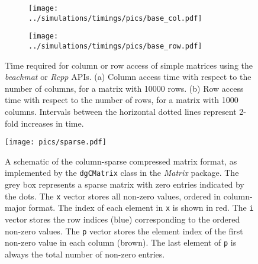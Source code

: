 \documentclass{article}
\newcommand{\beachmat}{\textit{beachmat}}
\begin{document}
\small



\newpage

\begin{figure}[bt]
    \centering
    \begin{subfigure}[b]{0.49\textwidth}
        \texttt{[image: ../simulations/timings/pics/base\_col.pdf]}
        \caption{}
    \end{subfigure}
    \begin{subfigure}[b]{0.49\textwidth}
        \texttt{[image: ../simulations/timings/pics/base\_row.pdf]}
        \caption{}
    \end{subfigure}
    \caption{Time required for column or row access of simple matrices using the \beachmat{} or \textit{Rcpp} APIs.
        (a) Column access time with respect to the number of columns, for a matrix with 10000 rows.
        (b) Row access time with respect to the number of rows, for a matrix with 1000 columns.
        Intervals between the horizontal dotted lines represent 2-fold increases in time.
    }
    \label{fig:basetime}
\end{figure}

\begin{figure}[bt]
    \centering
    \texttt{[image: pics/sparse.pdf]}
    \caption{A schematic of the column-sparse compressed matrix format, as implemented by the \texttt{dgCMatrix} class in the \textit{Matrix} package.
        The grey box represents a sparse matrix with zero entries indicated by the dots.
        The \texttt{x} vector stores all non-zero values, ordered in column-major format.
        The index of each element in \texttt{x} is shown in red.
        The \texttt{i} vector stores the row indices (blue) corresponding to the ordered non-zero values.
        The \texttt{p} vector stores the element index of the first non-zero value in each column (brown).
        The last element of \texttt{p} is always the total number of non-zero entries.
    }
    \label{fig:sparsefig}
\end{figure}
\end{document}
